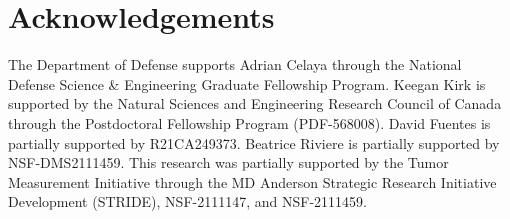 \documentclass[preprint,12pt]{elsarticle}
\begin{document}
\section{Acknowledgements}
The Department of Defense supports Adrian Celaya through the National Defense Science \& Engineering Graduate Fellowship Program. Keegan Kirk is supported by the Natural Sciences and Engineering Research Council of Canada through the Postdoctoral Fellowship Program (PDF-568008). David Fuentes is partially supported by R21CA249373. Beatrice Riviere is partially supported by NSF-DMS2111459. This research was partially supported by the Tumor Measurement Initiative through the MD Anderson Strategic Research Initiative Development (STRIDE), NSF-2111147, and NSF-2111459.

\clearpage


\end{document}

